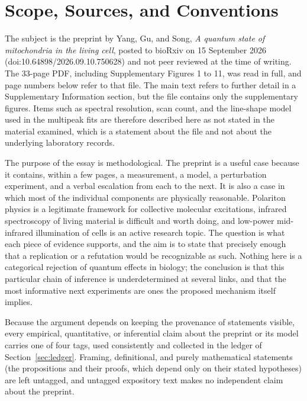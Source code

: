 \documentclass[11pt]{article}
\theoremstyle{plain}
\theoremstyle{definition}
\theoremstyle{remark}
\begin{document}
\section{Scope, Sources, and Conventions}

The subject is the preprint by Yang, Gu, and Song, \emph{A quantum state of mitochondria in the living cell}, posted to bioRxiv on 15 September 2026 (doi:10.64898/2026.09.10.750628) and not peer reviewed at the time of writing. The 33-page PDF, including Supplementary Figures 1 to 11, was read in full, and page numbers below refer to that file. The main text refers to further detail in a Supplementary Information section, but the file contains only the supplementary figures. Items such as spectral resolution, scan count, and the line-shape model used in the multipeak fits are therefore described here as not stated in the material examined, which is a statement about the file and not about the underlying laboratory records.

The purpose of the essay is methodological. The preprint is a useful case because it contains, within a few pages, a measurement, a model, a perturbation experiment, and a verbal escalation from each to the next. It is also a case in which most of the individual components are physically reasonable. Polariton physics is a legitimate framework for collective molecular excitations, infrared spectroscopy of living material is difficult and worth doing, and low-power mid-infrared illumination of cells is an active research topic. The question is what each piece of evidence supports, and the aim is to state that precisely enough that a replication or a refutation would be recognizable as such. Nothing here is a categorical rejection of quantum effects in biology; the conclusion is that this particular chain of inference is underdetermined at several links, and that the most informative next experiments are ones the proposed mechanism itself implies.

Because the argument depends on keeping the provenance of statements visible, every empirical, quantitative, or inferential claim about the preprint or its model carries one of four tags, used consistently and collected in the ledger of Section~\ref{sec:ledger}. Framing, definitional, and purely mathematical statements (the propositions and their proofs, which depend only on their stated hypotheses) are left untagged, and untagged expository text makes no independent claim about the preprint.
\end{document}
